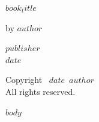 \documentclass[12pt]{memoir}
\def\booktitle{$book_title$}
\def\bookauthor{$author$}
\def\bookdate{$date$}
\def\bookpublisher{$publisher$}
\begin{document}
\thispagestyle{empty}
\begin{center}
\vspace*{1in}
{\Huge\bfseries\booktitle\par}
\vspace{1in}
{\Large by \bookauthor\par}
\vfill
{\large\bookpublisher}\\
{\bookdate}
\end{center}

\clearpage
\thispagestyle{empty}
\vspace*{\fill}
\begin{center}
Copyright \textcopyright\ \bookdate\ \bookauthor\\
All rights reserved.
\end{center}
\vspace*{\fill}

\clearpage
\tableofcontents

$body$
\end{document}
